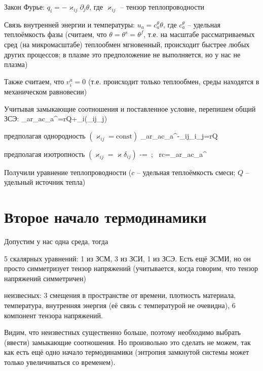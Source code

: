 \documentclass[main.tex]{subfiles}
\begin{document}
Закон Фурье: $q_i=-\varkappa_{ij}\partial_j\theta$, где $\varkappa_{ij}$ -- тензор теплопроводности

Связь внутренней энергии и температуры: $u_a=c_a^\theta\theta$, где $c_a^\theta$ -- удельная теплоёмкость фазы (считаем, что $\theta=\theta^s=\theta^f$, т.е. на масштабе рассматриваемых сред (на микромасштабе) теплообмен мгновенный, происходит быстрее любых других процессов; в плазме это предположение не выполняется, но у нас не плазма)

Также считаем, что $v_i^a=0$ (т.е. происходит только теплообмен, среды находятся в механическом равновесии)

Учитывая замыкающие соотношения и поставленное условие, перепишем общий ЗСЭ:
\beq\label{HT}
\sum\limits_{a}{r_ac_a^\theta{}}=rQ+\partial_i\left(\varkappa_{ij}\partial_j\theta\right)
\eeq

предполагая однородность $\left(\varkappa_{ij}=\text{const}\right)$
\beq\label{HeatTransfer}
\sum\limits_{a}{r_ac_a^\theta{}}-\varkappa_{ij}\partial_i\partial_j\theta=rQ
\eeq

предполагая изотропность $\left(\varkappa_{ij}=\varkappa\delta_{ij}\right)$
\beq
{}-\Delta\theta=\,\,\,;\,\,\, rc=\sum\limits_{a}{r_ac_a^\theta}
\eeq

Получили уравнение теплопроводности ($c$ -- удельная теплоёмкость смеси; $Q$ -- удельный источник тепла)

\newpage
\section{Второе начало термодинамики}

Допустим у нас одна среда, тогда

5 скалярных уравнений: 1 из ЗСМ, 3 из ЗСИ, 1 из ЗСЭ. Есть ещё ЗСМИ, но он просто симметризует тензор напряжений (учитывается, когда говорим, что тензор напряжений симметричен)

неизвесных: 3 смещения в пространстве от времени, плотность материала, температура, внутренняя энергия (её связь с температурой не очевидна), 6 компонент тензора напряжений.

Видим, что неизвестных существенно больше, поэтому необходимо выбрать (ввести) замыкающие соотношения. Но произвольно это сделать не можем, так как есть ещё одно начало термодинамики (энтропия замкнутой системы может только увеличиваться со временем).
\end{document}
